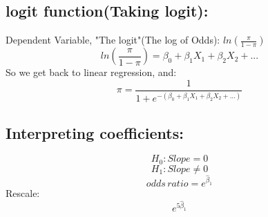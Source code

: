 \documentclass[12pt]{article}
\begin{document}
\subsection{logit function(Taking logit):}
Dependent Variable, "The logit"(The log of Odds): $ln(\frac{\pi}{1-\pi})$
$$ln(\frac{\pi}{1-\pi})=\beta_0+\beta_1 X_1+\beta_2 X_2 + ...$$
So we get back to linear regression, and:
$$\pi=\frac{1}{1+e^{-(\beta_0+\beta_1 X_1+\beta_2 X_2 + ...)}}$$

\subsection{Interpreting coefficients:}
$$H_0: Slope=0$$
$$H_1: Slope \neq 0$$
$$odds\,ratio = e^{\hat{\beta}_1}$$
Rescale:
$$e^{5\hat{\beta}_1}$$
\end{document}
